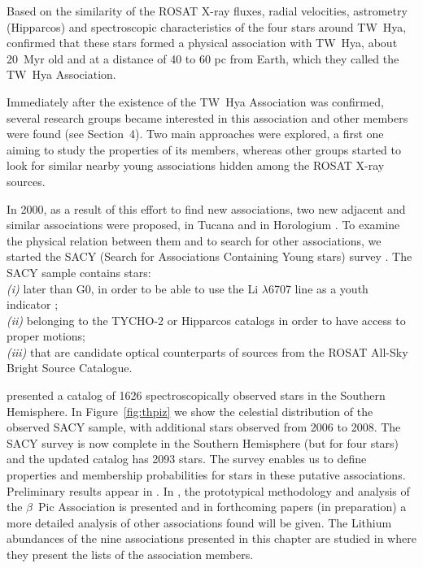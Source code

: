 \documentclass[11pt,twoside]{book}
\begin{document}
Based on the similarity of the ROSAT X-ray fluxes, radial velocities, astrometry (Hipparcos)
and spectroscopic characteristics of the four stars around TW~Hya, \cite{Kastner97}
confirmed that these stars formed a physical association with TW~Hya,
about 20~Myr old and at a distance of 40 to 60 pc from Earth, which they called
the TW~Hya Association.

Immediately after the existence of the TW~Hya Association was confirmed,
several research groups became interested in this association and other members
were found (see Section~4).
Two main approaches were explored, a first one
aiming to study the properties of its members, whereas other
groups started to look for similar nearby young associations
hidden among the ROSAT X-ray sources.


In 2000, as a result of this effort to find new associations, two new adjacent
and similar associations were proposed,
in Tucana \citep{zuckerman00} and in Horologium \citep{torres00}.
To examine the physical relation between them and to search for other associations,
we started the SACY (Search for Associations Containing Young stars) survey \citep{torres06}.
The SACY sample contains stars:\\
{\it (i)} later than G0, in order to be able to use the Li $\lambda$6707 line as a youth indicator \citep{martin97};\\
{\it (ii)} belonging to the TYCHO-2 or Hipparcos catalogs in order to have access to proper motions;\\
{\it (iii)} that are candidate  optical counterparts of sources from the ROSAT All-Sky
Bright Source Catalogue.

\citet{torres06} presented a catalog of 1626 spectroscopically
observed stars in the Southern Hemisphere.  In
Figure{~\ref{fig:thpiz}} we show the celestial distribution of the
observed SACY sample, with additional stars observed from 2006 to
2008.  The SACY survey is now complete in the Southern Hemisphere (but
for four stars) and the updated catalog has 2093 stars.  The survey
enables us to define properties and membership probabilities for stars
in these putative associations.  Preliminary results appear in
\citet{torres03a, torres03}.  In \citet{torres06}, the prototypical
methodology and analysis of the $\beta$~Pic Association is presented
and in forthcoming papers (in preparation) a more detailed analysis of
other associations found will be given.  The Lithium abundances of the
nine associations presented in this chapter are studied in
\citet{silva08} where they present the lists of the association
members.
\end{document}
